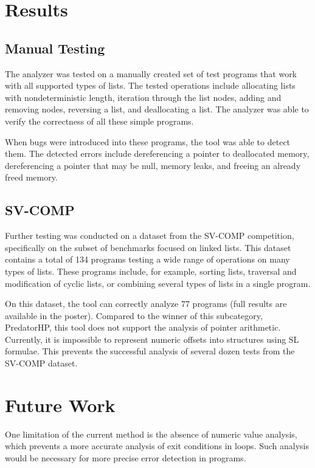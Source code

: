 \documentclass{ExcelAtFIT}
\begin{document}
\section{Results}

\subsection{Manual Testing}
The analyzer was tested on a manually created set of test programs that work with all supported types of lists. The tested operations include allocating lists with nondeterministic length, iteration through the list nodes, adding and removing nodes, reversing a list, and deallocating a list. The analyzer was able to verify the correctness of all these simple programs.

When bugs were introduced into these programs, the tool was able to detect them. The detected errors include dereferencing a pointer to deallocated memory, dereferencing a pointer that may be null, memory leaks, and freeing an already freed memory.

\subsection{SV-COMP}
Further testing was conducted on a dataset from the SV-COMP competition, specifically on the subset of benchmarks focused on linked lists. This dataset contains a total of 134 programs testing a wide range of operations on many types of lists. These programs include, for example, sorting lists, traversal and modification of cyclic lists, or combining several types of lists in a single program. 

On this dataset, the tool can correctly analyze 77 programs (full results are available in the poster). Compared to the winner of this subcategory, PredatorHP, this tool does not support the analysis of pointer arithmetic. Currently, it is impossible to represent numeric offsets into structures using SL formulae. This prevents the successful analysis of several dozen tests from the SV-COMP dataset.

\section{Future Work} 
One limitation of the current method is the absence of numeric value analysis, which prevents a more accurate analysis of exit conditions in loops. Such analysis would be necessary for more precise error detection in programs.
\end{document}
